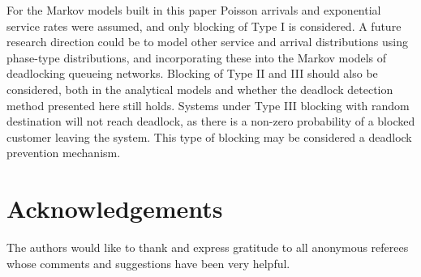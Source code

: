\documentclass{article}
\numberwithin{equation}{section}
\begin{document}
For the Markov models built in this paper Poisson arrivals and exponential
service rates were assumed, and only blocking of Type I is considered.
A future research direction could be to model other service and arrival
distributions using phase-type distributions, and incorporating these into the
Markov models of deadlocking queueing networks.
Blocking of Type II and III should also be considered, both in the analytical
models and whether the deadlock detection method presented here still holds.
Systems under Type III blocking with random destination will not reach deadlock,
as there is a non-zero probability of a blocked customer leaving the system.
This type of blocking may be considered a deadlock prevention mechanism.

\section{Acknowledgements}

The authors would like to thank and express gratitude to all anonymous
referees whose comments and suggestions have been very helpful.



\end{document}
